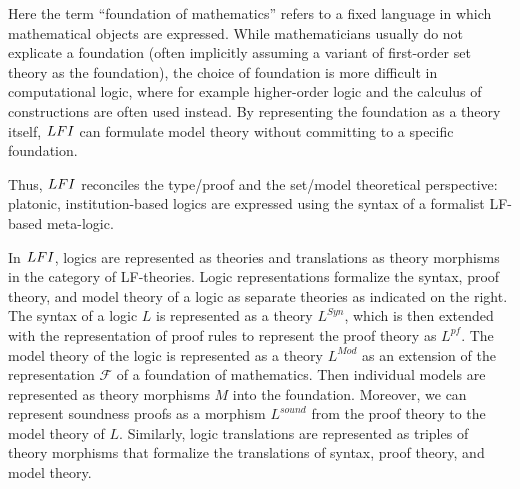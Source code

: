 Here the term ``foundation of mathematics'' refers to a fixed language in which mathematical objects are expressed.
While mathematicians usually do not explicate a foundation (often implicitly assuming a variant of first-order set theory as the foundation), the choice of foundation is more difficult in computational logic, where for example higher-order logic \cite{churchtypes} and the calculus of constructions \cite{calcconstructions} are often used instead.
By representing the foundation as a theory itself, $LFI$ can formulate model theory without committing to a specific foundation.

Thus, $LFI$ reconciles the type/proof and the set/model theoretical perspective: platonic, institution-based logics are expressed using the syntax of a formalist LF-based meta-logic.
\medskip

\begin{wrapfigure}{r}{3cm}
\vspace{-1em}
\vspace{-3em}
\end{wrapfigure}

In $LFI$, logics are represented as theories and translations as theory morphisms in the category of LF-theories.
Logic representations formalize the syntax, proof theory, and model theory of a logic as separate theories as indicated on the right.
The syntax of a logic $L$ is represented as a theory $L^{Syn}$, which is then extended with the representation of proof rules to represent the proof theory as $L^{pf}$.
The model theory of the logic is represented as a theory $L^{Mod}$ as an extension of the representation $\mathcal{F}$ of a foundation of mathematics.
Then individual models are represented as theory morphisms $M$ into the foundation.
Moreover, we can represent soundness proofs as a morphism $L^{sound}$ from the proof theory to the model theory of $L$.
Similarly, logic translations are represented as triples of theory morphisms that formalize the translations of syntax, proof theory, and model theory.


